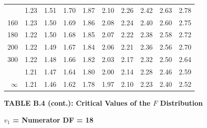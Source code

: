 \documentclass[10pt]{article}
\begin{document}
\begin{longtable}{@{}r!{\vrule width 0.8pt\hspace{0.55em}}rrrrrrrrr@{}}
 & 1.23 & 1.51 & 1.70 & 1.87 & 2.10 & 2.26 & 2.42 & 2.63 & 2.78 \\
160 & 1.23 & 1.50 & 1.69 & 1.86 & 2.08 & 2.24 & 2.40 & 2.60 & 2.75 \\
180 & 1.22 & 1.50 & 1.68 & 1.85 & 2.07 & 2.22 & 2.38 & 2.58 & 2.72 \\
200 & 1.22 & 1.49 & 1.67 & 1.84 & 2.06 & 2.21 & 2.36 & 2.56 & 2.70 \\
300 & 1.22 & 1.48 & 1.66 & 1.82 & 2.03 & 2.17 & 2.32 & 2.50 & 2.64 \\
 & 1.21 & 1.47 & 1.64 & 1.80 & 2.00 & 2.14 & 2.28 & 2.46 & 2.59 \\
$\infty$ & 1.21 & 1.46 & 1.62 & 1.78 & 1.97 & 2.10 & 2.23 & 2.40 & 2.52 \\
\end{longtable}
\newpage
\thispagestyle{empty}
\begin{center}
{\large\bfseries TABLE B.4 (cont.): Critical Values of the $F$ Distribution\par}
\end{center}
{\large\bfseries $v_1$ = Numerator DF = 18\par}
\vspace{0.5em}
\small
\end{document}
